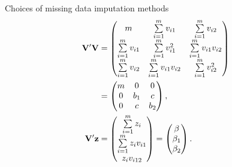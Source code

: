 \begin{frame}{Choices of missing data imputation methods}
\begin{align*}
        \mathbf{V}'\mathbf{V} &= \begin{pmatrix}
            m & \sum\limits_{i=1}^m v_{i1} &\sum\limits_{i=1}^m v_{i2}\\
            \sum\limits_{i=1}^m v_{i1} & \sum\limits_{i=1}^m v_{i1}^2 & \sum\limits_{i=1}^m v_{i1}v_{i2}\\
            \sum\limits_{i=1}^m v_{i2} &\sum\limits_{i=1}^m v_{i1}v_{i2} &\sum\limits_{i=1}^m v_{i2}^2
        \end{pmatrix}\\
        &= \begin{pmatrix}
            m & 0 & 0 \\
            0 & b_1 & c\\
            0 & c & b_2
        \end{pmatrix},\notag\\
\mathbf{V}'\mathbf{z} &= \begin{pmatrix}
            \sum\limits_{i=1}^m z_i \\\sum\limits_{i=1}^m z_iv_{i1} \\ z_iv_{i12}
        \end{pmatrix} = \begin{pmatrix}
            \beta \\ \beta_1 \\ \beta_2
        \end{pmatrix}.
            \end{align*}
\end{frame}
